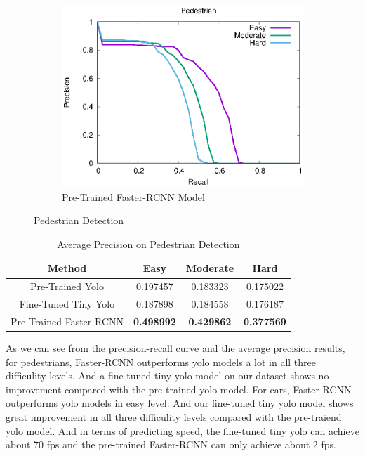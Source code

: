 \begin{figure}[H]
\begin{subfigure}{.34\textwidth}
    \includegraphics[width=1.0\linewidth]{img/FRCNN_Nov_8/plot_valid/pedestrian_detection.eps}
    \caption{Pre-Trained Faster-RCNN Model}
\end{subfigure}
\caption{Pedestrian Detection}
\end{figure}

\begin{table}[h!]
\centering
\begin{tabular}{ c | c | c | c }
\hline
Method & Easy & Moderate & Hard \\
\hline \hline
Pre-Trained Yolo & 0.197457 & 0.183323 & 0.175022 \\
Fine-Tuned Tiny Yolo & 0.187898 & 0.184558 & 0.176187 \\
Pre-Trained Faster-RCNN & \bfseries 0.498992 & \bfseries 0.429862 & \bfseries 0.377569 \\
\hline
\end{tabular}
\caption{Average Precision on Pedestrian Detection}
\end{table}

As we can see from the precision-recall curve and the average precision results, for pedestrians, Faster-RCNN outperforms yolo models a lot in all three difficulity levels. And a fine-tuned tiny yolo model on our dataset shows no improvement compared with the pre-trained yolo model. For cars, Faster-RCNN outperforms yolo models in easy level. And our fine-tuned tiny yolo model shows great improvement in all three difficulity levels compared with the pre-traiend yolo model. And
in terms of predicting speed, the fine-tuned tiny yolo can achieve about 70 fps and the pre-trained Faster-RCNN can only achieve about 2 fps.
